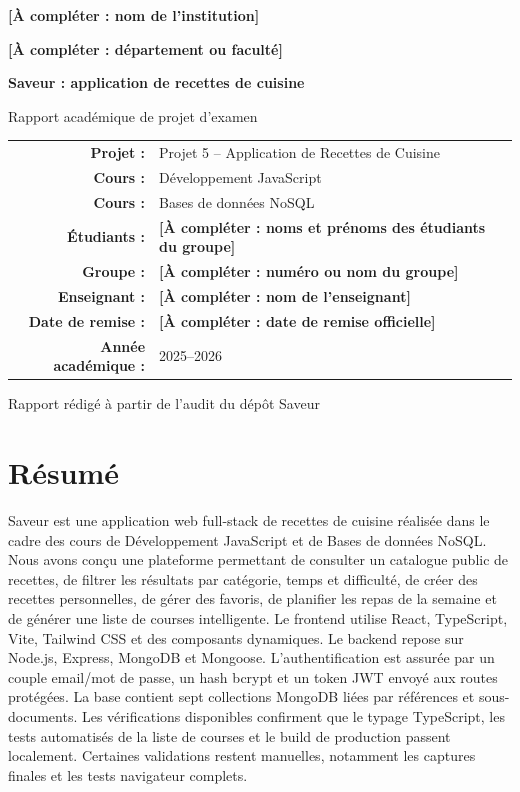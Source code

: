\documentclass[12pt,a4paper]{report}
\newcommand{\placeholder}[1]{\textbf{[À compléter : #1]}}
\begin{document}
\begin{titlepage}
\centering
\vspace*{1cm}
{\Large \placeholder{nom de l'institution}\par}
{\large \placeholder{département ou faculté}\par}
\vspace{1.8cm}
{\Huge\bfseries Saveur : application de recettes de cuisine\par}
\vspace{0.4cm}
{\Large Rapport académique de projet d'examen\par}
\vspace{1.3cm}
\begin{tabular}{rl}
\textbf{Projet :} & Projet 5 -- Application de Recettes de Cuisine \\
\textbf{Cours :} & Développement JavaScript \\
\textbf{Cours :} & Bases de données NoSQL \\
\textbf{Étudiants :} & \placeholder{noms et prénoms des étudiants du groupe} \\
\textbf{Groupe :} & \placeholder{numéro ou nom du groupe} \\
\textbf{Enseignant :} & \placeholder{nom de l'enseignant} \\
\textbf{Date de remise :} & \placeholder{date de remise officielle} \\
\textbf{Année académique :} & 2025--2026 \\
\end{tabular}
\vfill
{\large Rapport rédigé à partir de l'audit du dépôt Saveur\par}
\end{titlepage}

\chapter*{Résumé}
Saveur est une application web full-stack de recettes de cuisine réalisée dans le cadre des cours de Développement JavaScript et de Bases de données NoSQL. Nous avons conçu une plateforme permettant de consulter un catalogue public de recettes, de filtrer les résultats par catégorie, temps et difficulté, de créer des recettes personnelles, de gérer des favoris, de planifier les repas de la semaine et de générer une liste de courses intelligente. Le frontend utilise React, TypeScript, Vite, Tailwind CSS et des composants dynamiques. Le backend repose sur Node.js, Express, MongoDB et Mongoose. L'authentification est assurée par un couple email/mot de passe, un hash bcrypt et un token JWT envoyé aux routes protégées. La base contient sept collections MongoDB liées par références et sous-documents. Les vérifications disponibles confirment que le typage TypeScript, les tests automatisés de la liste de courses et le build de production passent localement. Certaines validations restent manuelles, notamment les captures finales et les tests navigateur complets.
\end{document}
